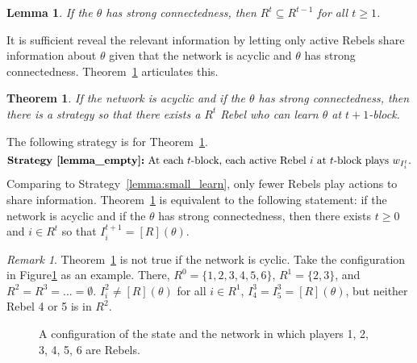 \documentclass[12pt,letter]{article}
\newtheorem{theorem}{Theorem}
\newtheorem{lemma}{Lemma}[section]
\theoremstyle{definition}
\theoremstyle{remark}
\newtheorem*{remark}{Remark}
\theoremstyle{claim}
\begin{document}
\begin{lemma}
\label{lemma_inclusion}
If the $\theta$ has strong connectedness, then 
$R^t\subseteq R^{t-1}$ for all $t\geq 1$.
\end{lemma}

It is sufficient reveal the relevant information by letting only active Rebels share information about $\theta$ given that the network is acyclic and $\theta$ has strong connectedness. Theorem~\ref{lemma_empty} articulates this.
\begin{theorem}
\label{lemma_empty}
If the network is acyclic and if the $\theta$ has strong connectedness, then there is a strategy so that there exists a $R^t$ Rebel who can learn $\theta$ at $t+1$-block.
\end{theorem}
The following strategy is for Theorem~\ref{lemma_empty}. 
\[\textbf{Strategy~\ref{lemma_empty}:}\text{ At each $t$-block, each active Rebel $i$ at $t$-block plays $w_{I^t_i}$.}\] Comparing to Strategy~\ref{lemma:small_learn}, only fewer Rebels play actions to share information. Theorem~\ref{lemma_empty} is equivalent to the following statement: if the network is acyclic and if the $\theta$ has strong connectedness, then there exists $t\geq 0$ and $i\in R^t$ so that $I^{t+1}_i=[R](\theta)$.
\begin{remark}
Theorem~\ref{lemma_empty} is not true if the network is cyclic. Take the configuration in Figure\ref{fig:circle_with_bridge} as an example. There, $R^0=\{1,2,3,4,5,6\}$, $R^1=\{2,3\}$, and $R^2=R^3=...=\emptyset$. $I^2_i\neq [R](\theta)$ for all $i\in R^1$, $I^3_4=I^3_5=[R](\theta)$, but neither Rebel 4 or 5 is in $R^2$.
\end{remark}

\begin{figure}

\begin{center}
\end{center}
\caption{A configuration of the state and the network in which players 1, 2, 3, 4, 5, 6 are Rebels.}
\label{fig:circle_with_bridge}
\end{figure}
\end{document}
